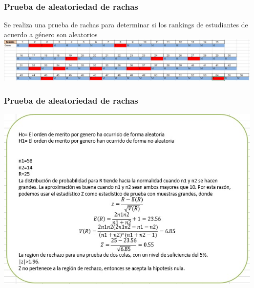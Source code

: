 \begin{frame}
    \frametitle{Prueba de aleatoriedad de rachas}
    Se realiza una prueba de rachas para determinar si los
    rankings de estudiantes de acuerdo a género son aleatorios
    \includegraphics[width=1\textwidth]{cap/images/rachas/rachas_resultados.jpg}
\end{frame}

\begin{frame}
    \frametitle{Prueba de aleatoriedad de rachas}
    \includegraphics[width=1\textwidth]{cap/images/rachas/rachas_explicacion.jpg}
\end{frame}